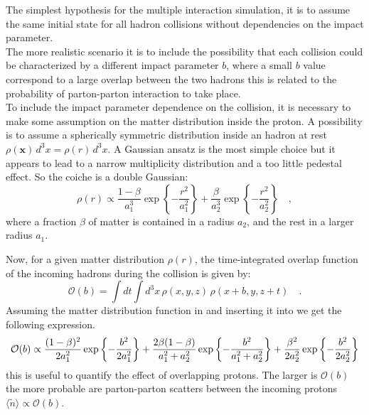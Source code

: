 The simplest hypothesis for the multiple interaction simulation, it is to assume the same initial state for all hadron collisions without dependencies on the impact parameter. 
\\
The more realistic scenario it is to include the possibility that each collision could be characterized by a different impact parameter $b$, where a small $b$ value correspond to a large overlap between the two hadrons this is related to the probability of parton-parton interaction to take place.
\\
To include the impact parameter dependence on the collision, it is necessary to make some assumption on the matter distribution inside the proton. A possibility is to assume a spherically symmetric distribution inside an hadron at rest $\rho(\mathbf{x})\,d^3x=\rho(r)\,d^3x$. A Gaussian ansatz is the most simple choice but it appears to lead to a narrow multiplicity distribution and a too little pedestal effect. So the coiche is a double Gaussian:
\begin{equation}
	\rho(r) \propto \frac{1-\beta}{a_1^3}\exp\left\{-\frac{r^2}{a_1^2}\right\}+\frac{\beta}{a_2^3}\exp\left\{ -\frac{r^2}{a_2^2} \right\}\quad,
	\label{eq:matterDistribution}
\end{equation}
where a fraction $\beta$ of matter is contained in a radius $a_2$, and the rest in a larger radius $a_1$.

\medskip

Now, for a given matter distribution $\rho(r)$,  the time-integrated overlap function of the incoming hadrons during the collision is given by:
\begin{equation}
	\mathcal{O}(b)=\displaystyle\int dt \displaystyle\int d^3x\,\rho(x,y,z)\,\rho(x+b,y,z+t)\quad.
	\label{eq:overlappingFunction}
\end{equation} 
Assuming the matter distribution function in  and inserting it into  we get  the following expression.
\begin{equation}
\small{
	\mathcal{O}(b)\propto \frac{(1-\beta)^2}{2a_1^2}\exp\left\{-\frac{b^2}{2a_1^2}\right\}+\frac{2\beta(1-\beta)}{a_1^2+a_2^2}\exp\left\{ -\frac{b^2}{a_1^2+a_2^2} \right\}+\frac{\beta^2}{2a_2^2}\exp\left\{-\frac{b^2}{2a_2^2}\right\}
	}
\end{equation}
this is useful to quantify the effect of overlapping protons.
The larger is $\mathcal{O}(b)$ the more probable are parton-parton scatters between the incoming protons $\langle \widetilde{n} \rangle\propto \mathcal{O}(b)$.

